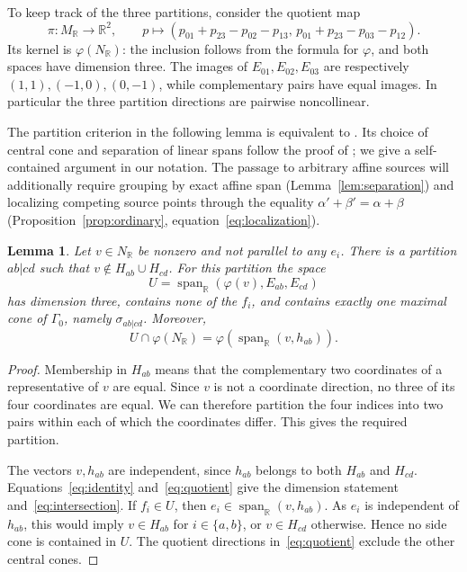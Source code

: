\documentclass[11pt]{article}
\newtheorem{lemma}[theorem]{Lemma}
\theoremstyle{definition}
\theoremstyle{remark}
\newcommand{\R}{\mathbb R}
\newcommand{\NR}{N_{\R}}
\newcommand{\MR}{M_{\R}}
\newcommand{\Span}{\operatorname{span}_{\R}}
\begin{document}
To keep track of the three partitions, consider the quotient map
\begin{equation}\label{eq:quotient}
 \pi:\MR\longrightarrow\R^2,\qquad
 p\longmapsto
 (p_{01}+p_{23}-p_{02}-p_{13},\,
  p_{01}+p_{23}-p_{03}-p_{12}).
\end{equation}
Its kernel is $\varphi(\NR)$: the inclusion follows from the formula
for $\varphi$, and both spaces have dimension three. The images of
$E_{01},E_{02},E_{03}$ are respectively
$(1,1),(-1,0),(0,-1)$, while complementary pairs have equal images.
In particular the three partition directions are pairwise noncollinear.

The partition criterion in the following lemma is equivalent to
\cite[Lemma~3.7]{Tripoli}. Its choice of central cone and separation of
linear spans follow the proof of \cite[Theorem~3.9]{Tripoli}; we give a
self-contained argument in our notation. The passage to arbitrary affine
sources will additionally require grouping by exact affine span
(Lemma~\ref{lem:separation}) and localizing competing source points through
the equality $\alpha'+\beta'=\alpha+\beta$
(Proposition~\ref{prop:ordinary}, equation~\eqref{eq:localization}).

\begin{lemma}\label{lem:ordinary-linear}
Let $v\in\NR$ be nonzero and not parallel to any $e_i$. There is a
partition $ab|cd$ such that $v\notin H_{ab}\cup H_{cd}$. For this
partition the space
\[
 U=\Span(\varphi(v),E_{ab},E_{cd})
\]
has dimension three, contains none of the $f_i$, and contains exactly
one maximal cone of $\Gamma_0$, namely $\sigma_{ab|cd}$.
Moreover,
\begin{equation}\label{eq:intersection}
 U\cap\varphi(\NR)=\varphi(\Span(v,h_{ab})).
\end{equation}
\end{lemma}

\begin{proof}
Membership in $H_{ab}$ means that the complementary two coordinates
of a representative of $v$ are equal. Since $v$ is not a coordinate
direction, no three of its four coordinates are equal. We can therefore
partition the four indices into two pairs within each of which the
coordinates differ. This gives the required partition.

The vectors $v,h_{ab}$ are independent, since $h_{ab}$ belongs to both
$H_{ab}$ and $H_{cd}$. Equations~\eqref{eq:identity}
and~\eqref{eq:quotient} give the dimension statement
and~\eqref{eq:intersection}. If $f_i\in U$, then
$e_i\in\Span(v,h_{ab})$. As $e_i$ is independent of $h_{ab}$, this
would imply $v\in H_{ab}$ for $i\in\{a,b\}$, or $v\in H_{cd}$
otherwise. Hence no side cone is contained in $U$. The quotient
directions in~\eqref{eq:quotient} exclude the other central cones.
\end{proof}
\end{document}
